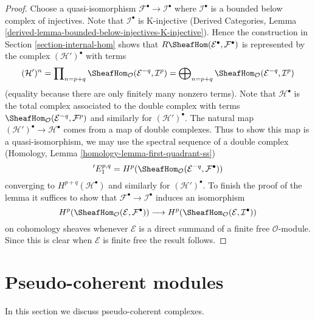 \begin{proof}
Choose a quasi-isomorphism $\mathcal{F}^\bullet \to \mathcal{I}^\bullet$
where $\mathcal{I}^\bullet$ is a bounded below complex of injectives.
Note that $\mathcal{I}^\bullet$ is K-injective
(Derived Categories, Lemma
\ref{derived-lemma-bounded-below-injectives-K-injective}).
Hence the construction in Section \ref{section-internal-hom}
shows that
$R\SheafHom(\mathcal{E}^\bullet, \mathcal{F}^\bullet)$ is 
represented by the complex $(\mathcal{H}')^\bullet$ with terms
$$
(\mathcal{H}')^n =
\prod\nolimits_{n = p + q}
\SheafHom_\mathcal{O}(\mathcal{E}^{-q}, \mathcal{I}^p) =
\bigoplus\nolimits_{n = p + q}
\SheafHom_\mathcal{O}(\mathcal{E}^{-q}, \mathcal{I}^p)
$$
(equality because there are only finitely many nonzero terms).
Note that $\mathcal{H}^\bullet$ is the total complex associated to
the double complex with terms
$\SheafHom_\mathcal{O}(\mathcal{E}^{-q}, \mathcal{F}^p)$
and similarly for $(\mathcal{H}')^\bullet$.
The natural map $(\mathcal{H}')^\bullet \to \mathcal{H}^\bullet$
comes from a map of double complexes.
Thus to show this map is a quasi-isomorphism, we may use the spectral
sequence of a double complex
(Homology, Lemma \ref{homology-lemma-first-quadrant-ss})
$$
{}'E_1^{p, q} =
H^p(\SheafHom_\mathcal{O}(\mathcal{E}^{-q}, \mathcal{F}^\bullet))
$$
converging to $H^{p + q}(\mathcal{H}^\bullet)$ and similarly for
$(\mathcal{H}')^\bullet$. To finish the proof of the lemma it
suffices to show that $\mathcal{F}^\bullet \to \mathcal{I}^\bullet$
induces an isomorphism
$$
H^p(\SheafHom_\mathcal{O}(\mathcal{E}, \mathcal{F}^\bullet))
\longrightarrow
H^p(\SheafHom_\mathcal{O}(\mathcal{E}, \mathcal{I}^\bullet))
$$
on cohomology sheaves whenever $\mathcal{E}$ is a direct summand of a
finite free $\mathcal{O}$-module. Since this is clear when $\mathcal{E}$
is finite free the result follows.
\end{proof}









\section{Pseudo-coherent modules}
\label{section-pseudo-coherent}

\noindent
In this section we discuss pseudo-coherent complexes.

